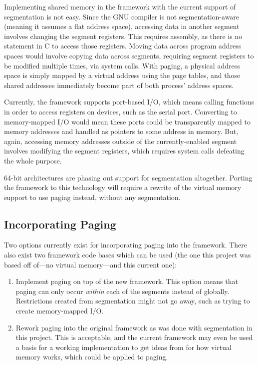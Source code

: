 \documentclass[titlepage]{article}
\begin{document}
Implementing shared memory in the framework with the current support of
segmentation is not easy. Since the GNU compiler is not segmentation-aware
(meaning it assumes a flat address space), accessing data in another segment
involves changing the segment registers. This requires assembly, as there is no
statement in C to access those registers. Moving data across program address
spaces would involve copying data across segments, requiring segment registers
to be modified multiple times, via system calls. With paging, a physical address
space is simply mapped by a virtual address using the page tables, and those
shared addresses immediately become part of both process' address spaces.

Currently, the framework supports port-based I/O, which means calling functions
in order to access registers on devices, such as the serial port. Converting to
memory-mapped I/O would mean these ports could be transparently mapped to memory
addresses and handled as pointers to some address in memory. But, again,
accessing memory addresses outside of the currently-enabled segment involves
modifying the segment registers, which requires system calls defeating the whole
purpose.

64-bit architectures are phasing out support for segmentation altogether.
Porting the framework to this technology will require a rewrite of the virtual
memory support to use paging instead, without any segmentation.

\subsection{Incorporating Paging}

Two options currently exist for incorporating paging into the framework. There
also exist two framework code bases which can be used (the one this project was
based off of---no virtual memory---and this current one):

\begin{enumerate}
    \item Implement paging on top of the new framework. This option means that
    paging can only occur \textit{within} each of the segments instead of
    globally. Restrictions created from segmentation might not go away, such as
    trying to create memory-mapped I/O.
    \item Rework paging into the original framework as was done with
    segmentation in this project. This is acceptable, and the current framework
    may even be used a basis for a working implementation to get ideas from for
    how virtual memory works, which could be applied to paging.
\end{enumerate}
\end{document}
